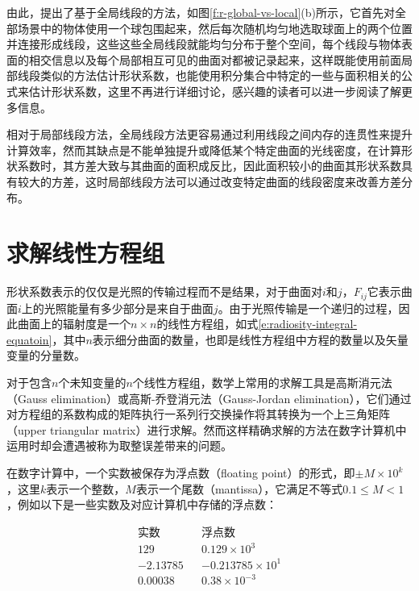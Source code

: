由此，\cite{a:AnIntegralGeometryBasedMethodforFastForm-FactorComputation}提出了基于全局线段的方法，如图\ref{f:r-global-vs-local}(b)所示，它首先对全部场景中的物体使用一个球包围起来，然后每次随机均匀地选取球面上的两个位置并连接形成线段，这些这些全局线段就能均匀分布于整个空间，每个线段与物体表面的相交信息以及每个局部相互可见的曲面对都被记录起来，这样既能使用前面局部线段类似的方法估计形状系数，也能使用积分集合中特定的一些与面积相关的公式来估计形状系数，这里不再进行详细讨论，感兴趣的读者可以进一步阅读\cite{a:TheUseofGlobalRandomDirectionstoComputeRadiosityGlobalMonteCarloTechniques}了解更多信息。

相对于局部线段方法，全局线段方法更容易通过利用线段之间内存的连贯性来提升计算效率，然而其缺点是不能单独提升或降低某个特定曲面的光线密度，在计算形状系数时，其方差大致与其曲面的面积成反比，因此面积较小的曲面其形状系数具有较大的方差，这时局部线段方法可以通过改变特定曲面的线段密度来改善方差分布。





\section{求解线性方程组}\label{sec:r-solving-linear-equations}
形状系数表示的仅仅是光照的传输过程而不是结果，对于曲面对$i$和$j$，$F_{ij}$它表示曲面$i$上的光照能量有多少部分是来自于曲面$j$。由于光照传输是一个递归的过程，因此曲面上的辐射度是一个$n\times n$的线性方程组，如式\ref{e:radiosity-integral-equatoin}，其中$n$表示细分曲面的数量，也即是线性方程组中方程的数量以及矢量变量的分量数。

对于包含$n$个未知变量的$n$个线性方程组，数学上常用的求解工具是高斯消元法（Gauss elimination）或高斯-乔登消元法（Gauss-Jordan elimination），它们通过对方程组的系数构成的矩阵执行一系列行交换操作将其转换为一个上三角矩阵（upper triangular matrix）进行求解。然而这样精确求解的方法在数字计算机中运用时却会遭遇被称为取整误差带来的问题。

在数字计算中，一个实数被保存为浮点数（floating point）的形式，即$\pm M\times 10^{k}$，这里$k$表示一个整数，$M$表示一个尾数（mantissa），它满足不等式$0.1\leq M<1$，例如以下是一些实数及对应计算机中存储的浮点数：

\begin{equation}
\begin{aligned}
	\text{实数}   &&   \text{浮点数}	\\
	129          &&   0.129\times 10^{3}\\
	-2.13785 	 &&   -0.213785\times 10^{1}\\
	0.00038      &&   0.38\times 10^{-3}
\end{aligned}
\end{equation}

